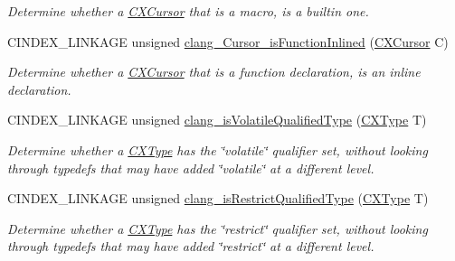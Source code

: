 \begin{DoxyCompactItemize}
\begin{DoxyCompactList}\small\item\em Determine whether a \hyperlink{structCXCursor}{C\+X\+Cursor} that is a macro, is a builtin one. \end{DoxyCompactList}\item 
\mbox{\label{group__CINDEX__TYPES_ga963097b9aecabf5dce7554dff18b061d}} 
C\+I\+N\+D\+E\+X\+\_\+\+L\+I\+N\+K\+A\+GE unsigned \hyperlink{group__CINDEX__TYPES_ga963097b9aecabf5dce7554dff18b061d}{clang\+\_\+\+Cursor\+\_\+is\+Function\+Inlined} (\hyperlink{structCXCursor}{C\+X\+Cursor} C)
\begin{DoxyCompactList}\small\item\em Determine whether a \hyperlink{structCXCursor}{C\+X\+Cursor} that is a function declaration, is an inline declaration. \end{DoxyCompactList}\item 
\mbox{\label{group__CINDEX__TYPES_gaac0ac93cded7d1e5c60f539daaed13ec}} 
C\+I\+N\+D\+E\+X\+\_\+\+L\+I\+N\+K\+A\+GE unsigned \hyperlink{group__CINDEX__TYPES_gaac0ac93cded7d1e5c60f539daaed13ec}{clang\+\_\+is\+Volatile\+Qualified\+Type} (\hyperlink{structCXType}{C\+X\+Type} T)
\begin{DoxyCompactList}\small\item\em Determine whether a \hyperlink{structCXType}{C\+X\+Type} has the \char`\"{}volatile\char`\"{} qualifier set, without looking through typedefs that may have added \char`\"{}volatile\char`\"{} at a different level. \end{DoxyCompactList}\item 
\mbox{\label{group__CINDEX__TYPES_ga12375c30c12b0c3ede87492605db1d0c}} 
C\+I\+N\+D\+E\+X\+\_\+\+L\+I\+N\+K\+A\+GE unsigned \hyperlink{group__CINDEX__TYPES_ga12375c30c12b0c3ede87492605db1d0c}{clang\+\_\+is\+Restrict\+Qualified\+Type} (\hyperlink{structCXType}{C\+X\+Type} T)
\begin{DoxyCompactList}\small\item\em Determine whether a \hyperlink{structCXType}{C\+X\+Type} has the \char`\"{}restrict\char`\"{} qualifier set, without looking through typedefs that may have added \char`\"{}restrict\char`\"{} at a different level. \end{DoxyCompactList}\item 
\mbox{\label{group__CINDEX__TYPES_gaafa3eb34932d8da1358d50ed949ff3ee}} 

\end{DoxyCompactItemize}
